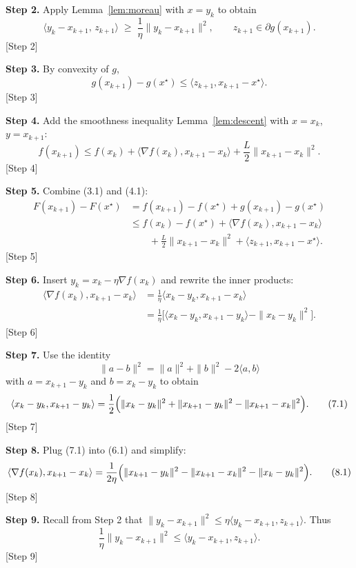 \documentclass{article}
\begin{document}
\noindent\textbf{Step 2.} Apply Lemma~\ref{lem:moreau} with $x=y_{k}$ to obtain
\[
\bigl\langle y_{k}-x_{k+1},\,z_{k+1}\bigr\rangle
\;\ge\;
\frac{1}{\eta}\|y_{k}-x_{k+1}\|^{2},
\qquad
z_{k+1}\in\partial g(x_{k+1}).
\tag{2.1}
\]
\hfill[Step 2]

\noindent\textbf{Step 3.} By convexity of $g$,
\[
g(x_{k+1})-g(x^{\star})\le\langle z_{k+1}, x_{k+1}-x^{\star}\rangle.
\tag{3.1}
\]
\hfill[Step 3]

\noindent\textbf{Step 4.} Add the smoothness inequality Lemma~\ref{lem:descent} with $x=x_{k}$, $y=x_{k+1}$:
\[
f(x_{k+1})\le f(x_{k})+\langle\nabla f(x_{k}),x_{k+1}-x_{k}\rangle
+\frac{L}{2}\|x_{k+1}-x_{k}\|^{2}.
\tag{4.1}
\]
\hfill[Step 4]

\noindent\textbf{Step 5.} Combine (3.1) and (4.1):
\[
\begin{aligned}
F(x_{k+1})-F(x^{\star})
&=f(x_{k+1})-f(x^{\star})+g(x_{k+1})-g(x^{\star})\\
&\le f(x_{k})-f(x^{\star})+\langle\nabla f(x_{k}),x_{k+1}-x_{k}\rangle\\
&\qquad+\frac{L}{2}\|x_{k+1}-x_{k}\|^{2}
+\langle z_{k+1},x_{k+1}-x^{\star}\rangle .
\end{aligned}
\tag{5.1}
\]
\hfill[Step 5]

\noindent\textbf{Step 6.} Insert $y_{k}=x_{k}-\eta\nabla f(x_{k})$ and rewrite the inner products:
\[
\begin{aligned}
\langle\nabla f(x_{k}),x_{k+1}-x_{k}\rangle
&= \frac{1}{\eta}\langle x_{k}-y_{k},x_{k+1}-x_{k}\rangle\\
&= \frac{1}{\eta}\bigl[\langle x_{k}-y_{k},x_{k+1}-y_{k}\rangle
-\|x_{k}-y_{k}\|^{2}\bigr].
\end{aligned}
\tag{6.1}
\]
\hfill[Step 6]

\noindent\textbf{Step 7.} Use the identity
\[
\|a-b\|^{2}= \|a\|^{2}+\|b\|^{2}-2\langle a,b\rangle
\]
with $a=x_{k+1}-y_{k}$ and $b=x_{k}-y_{k}$ to obtain
\[
\langle x_{k}-y_{k},x_{k+1}-y_{k}\rangle
= \frac{1}{2}\Bigl(\|x_{k}-y_{k}\|^{2}
+\|x_{k+1}-y_{k}\|^{2}
-\|x_{k+1}-x_{k}\|^{2}\Bigr).
\tag{7.1}
\]
\hfill[Step 7]

\noindent\textbf{Step 8.} Plug (7.1) into (6.1) and simplify:
\[
\langle\nabla f(x_{k}),x_{k+1}-x_{k}\rangle
= \frac{1}{2\eta}\Bigl(\|x_{k+1}-y_{k}\|^{2}
-\|x_{k+1}-x_{k}\|^{2}
-\|x_{k}-y_{k}\|^{2}\Bigr).
\tag{8.1}
\]
\hfill[Step 8]

\noindent\textbf{Step 9.} Recall from Step 2 that $\|y_{k}-x_{k+1}\|^{2}\le\eta\langle y_{k}-x_{k+1},z_{k+1}\rangle$.
Thus
\[
\frac{1}{\eta}\|y_{k}-x_{k+1}\|^{2}\le \langle y_{k}-x_{k+1},z_{k+1}\rangle .
\tag{9.1}
\]
\hfill[Step 9]
\end{document}

